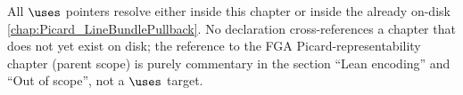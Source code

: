 All \(\uses\) pointers resolve either inside this chapter or inside the already
on-disk \cref{chap:Picard_LineBundlePullback}. No declaration cross-references
a chapter that does not yet exist on disk; the reference to
the FGA Picard-representability chapter (parent scope) is purely commentary in the section
``Lean encoding'' and ``Out of scope'', not a \(\uses\) target.
